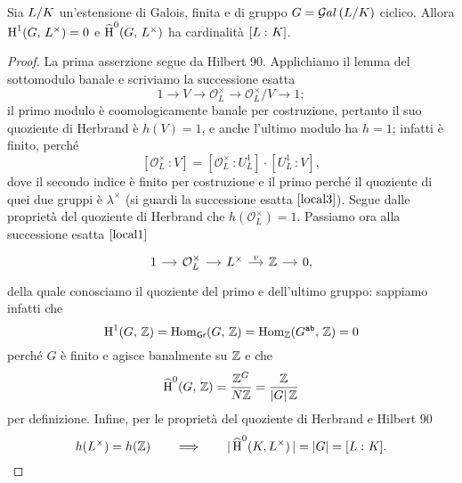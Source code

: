 \begin{theorem} \label{assioma}
	Sia $ L/K $ un'estensione di Galois, finita e di gruppo $ G = \mathcal{G}al\left( L/K \right) $ ciclico. Allora $ \operatorname{H}^1(G, \, L^\times) = 0 $ e $ \operatorname{\widehat{H}}^0(G, \, L^\times) $ ha cardinalità $ [L \, \colon K] $.
\end{theorem}
\begin{proof}
	La prima asserzione segue da Hilbert 90. Applichiamo il lemma del sottomodulo banale e scriviamo la successione esatta 
	\[ 1 \to V \to \mathcal{O}_L^\times \to \mathcal{O}_L^\times/V \to 1; \]
	il primo modulo è coomologicamente banale per costruzione, pertanto il suo quoziente di Herbrand è $ h(V) = 1 $, e anche l'ultimo modulo ha $ h = 1 $; infatti è finito, perché $$  [\mathcal{O}_L^\times \, \colon V] = [\mathcal{O}_L^\times \,\colon U_L^1]\cdot[U_L^1 \,\colon V],  $$
	dove il secondo indice è finito per costruzione e il primo perché il quoziente di quei due gruppi è $ \lambda^\times $ (si guardi la successione esatta $ \ref{local3} $). Segue dalle proprietà del quoziente di Herbrand che $ h(\mathcal{O}_L^\times) = 1 $. Passiamo ora alla successione esatta $ \ref{local1} $
	\[ \begin{tikzcd}[column sep = small]
	1 \rar
	& \mathcal{O}_{L}^\times \rar
	& L^\times \rar["v"]
	& \Z \rar
	& 0,
	\end{tikzcd} \]
	della quale conosciamo il quoziente del primo e dell'ultimo gruppo: sappiamo infatti che $$  \operatorname{H}^1(G, \, \mathbb{Z}) = \operatorname{Hom}_\mathsf{Gr}(G, \, \mathbb{Z}) = \operatorname{Hom}_{\mathbb{Z}}(G^\texttt{ab}, \, \mathbb{Z}) = 0  $$ perché $ G $ è finito e agisce banalmente su $ \mathbb{Z} $ e che $$  \operatorname{\widehat{H}}^0(G, \, \mathbb{Z}) = \frac{\mathbb{Z}^G}{ N\mathbb{Z}} = \frac{\mathbb{Z}}{ |G|\, \mathbb{Z}}  $$ per definizione. Infine, per le proprietà del quoziente di Herbrand e Hilbert 90
	\[ h(L^\times) = h(\mathbb{Z}) \qquad\Longrightarrow\qquad |\operatorname{\widehat{H}}^0(K, L^\times)\, | = |G| = [L \, \colon K]. \]
\end{proof}

